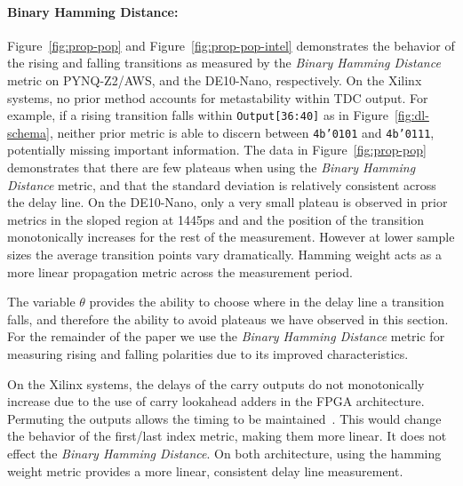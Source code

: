 


\paragraph{Binary Hamming Distance: }
Figure~\ref{fig:prop-pop} and Figure~\ref{fig:prop-pop-intel} demonstrates the behavior of the rising and falling transitions as measured by the \textit{Binary Hamming Distance} metric on PYNQ-Z2/AWS, and the DE10-Nano, respectively. On the Xilinx systems, no prior method accounts for metastability within TDC output. For example, if a rising transition falls within \texttt{Output[36:40]} as in Figure~\ref{fig:dl-schema}, neither prior metric is able to discern between \texttt{4b'0101} and \texttt{4b'0111}, potentially missing important information. The data in Figure~\ref{fig:prop-pop} demonstrates that there are few plateaus when using the \textit{Binary Hamming Distance} metric, and that the standard deviation is relatively consistent across the delay line. On the DE10-Nano, only a very small plateau is observed in prior metrics in the sloped region at 1445ps and and the position of the transition monotonically increases for the rest of the measurement. However at lower sample sizes the average transition points vary dramatically. Hamming weight acts as a more linear propagation metric across the measurement period.   

The variable $\theta$ provides the ability to choose where in the delay line a transition falls, and therefore the ability to avoid plateaus we have observed in this section. For the remainder of the paper we use the \textit{Binary Hamming Distance} metric for measuring rising and falling polarities due to its improved characteristics.

On the Xilinx systems, the delays of the carry outputs do not monotonically increase due to the use of carry lookahead adders in the FPGA architecture. Permuting the outputs allows the timing to be maintained~\cite{glamovcanin2020cloud}. This would change the behavior of the first/last index metric, making them more linear. It does not effect the \textit{Binary Hamming Distance}. On both architecture, using the hamming weight metric provides a more linear, consistent delay line measurement.

